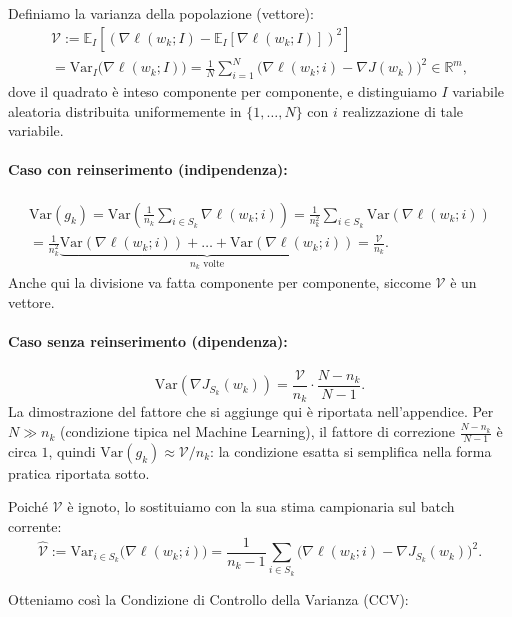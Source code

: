 \documentclass[a4paper,12pt]{article}
\numberwithin{equation}{section}
\numberwithin{figure}{section}
\numberwithin{table}{section}
\newcommand{\Var}{\mathrm{Var}}
\begin{document}
Definiamo la varianza della popolazione (vettore):
\[
\begin{gathered}
\mathcal{V}
:= \mathbb{E}_{I}\left[ \left( \nabla \ell(w_k; I) - \mathbb{E}_{I}[\nabla \ell(w_k; I)] \right)^{2} \right] \\
= \Var_{I}\bigl(\nabla \ell(w_k; I)\bigr) 
= \frac{1}{N}\sum_{i=1}^{N}\bigl(\nabla \ell(w_k; i) - \nabla J(w_k)\bigr)^2 \in \mathbb{R}^m,
\end{gathered}
\]
dove il quadrato è inteso componente per componente, e distinguiamo $I$ variabile aleatoria distribuita uniformemente in $\{1,\dots,N\}$ con $i$ realizzazione di tale variabile.

\paragraph{Caso con reinserimento (indipendenza):}
\[
\begin{gathered}
  \Var(g_k) = \Var\!\left(\frac{1}{n_k}\sum_{i\in S_k}\nabla\ell(w_k;i)\right)
  = \frac{1}{n_k^2}\sum_{i\in S_k}\Var(\nabla\ell(w_k;i)) \\
  = \frac{1}{n_k^2}\underbrace{\Var(\nabla\ell(w_k;i))+\dots+\Var(\nabla\ell(w_k;i))}_{n_k \text{ volte}}
  = \frac{\mathcal{V}}{n_k}.
\end{gathered}
\]
Anche qui la divisione va fatta componente per componente, siccome $\mathcal{V}$ è un vettore.

\paragraph{Caso senza reinserimento (dipendenza):}
\[
  \Var\!\left(\nabla J_{S_k}(w_k)\right) = \frac{\mathcal{V}}{n_k}\cdot\frac{N-n_k}{N-1}.
\]
La dimostrazione del fattore che si aggiunge qui è riportata nell'appendice.
Per $N \gg n_k$ (condizione tipica nel Machine Learning), il fattore di correzione $\frac{N-n_k}{N-1}$ è circa $1$, quindi $\Var(g_k) \approx \mathcal{V}/n_k$: la condizione esatta si semplifica nella forma pratica riportata sotto.

Poich\'e $\mathcal{V}$ \`e ignoto, lo sostituiamo con la sua stima campionaria sul batch corrente:
\[
  \widehat{\mathcal{V}} := \Var_{i \in S_k}\bigl(\nabla \ell(w_k;i)\bigr)
  = \frac{1}{n_k-1}\sum_{i\in S_k}\bigl(\nabla \ell(w_k;i) - \nabla J_{S_k}(w_k)\bigr)^2.
\]

Otteniamo cos\`i la Condizione di Controllo della Varianza (CCV):
\end{document}
